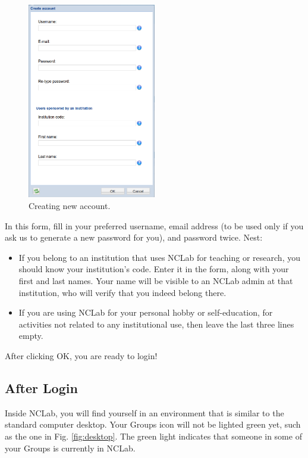 \documentclass[article,A4,12pt]{llncs}
\begin{document}
\begin{figure}[!ht]
\begin{center}
\includegraphics[width=0.5\textwidth]{img/create-account.png}
\end{center}
\caption{Creating new account.}
\label{fig:creacc}
\end{figure}

\noindent
In this form, fill in your preferred username, email address (to be used only if you ask
us to generate a new password for you), and password twice. Nest:

\begin{itemize}
\item If you belong to an institution 
      that uses NCLab for teaching or research, you should know your institution's code. Enter it in the form, 
      along with your first and last names. Your name will be visible to an NCLab admin at that 
      institution, who will verify that you indeed belong there.
\item If you are using NCLab for your personal hobby or self-education, for activities not 
      related to any institutional use, then leave the last three lines empty. 
\end{itemize}
After clicking OK, you are ready to login!

\subsection{After Login}

Inside NCLab, you will find yourself in an environment that is similar
to the standard computer desktop. Your Groups icon will not be lighted 
green yet, such as the one in Fig. \ref{fig:desktop}. The green light 
indicates that someone in some of your Groups is currently in NCLab. 
\end{document}
